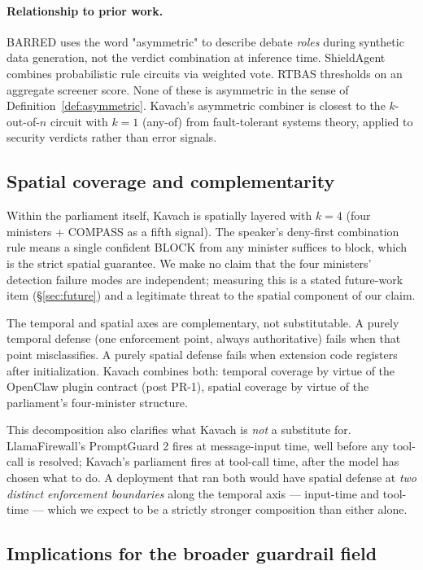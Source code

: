 \paragraph{Relationship to prior work.} BARRED \cite{barred2026} uses the word
"asymmetric" to describe debate \emph{roles} during synthetic data generation,
not the verdict combination at inference time. ShieldAgent
\cite{chen2025shieldagent} combines probabilistic rule circuits via weighted
vote. RTBAS \cite{zhong2025rtbas} thresholds on an aggregate screener score.
None of these is asymmetric in the sense of Definition~\ref{def:asymmetric}.
Kavach's asymmetric combiner is closest to the $k$-out-of-$n$ circuit with
$k=1$ (any-of) from fault-tolerant systems theory, applied to security verdicts
rather than error signals.

\subsection{Spatial coverage and complementarity}

Within the parliament itself, Kavach is spatially layered with \(k=4\)
(four ministers + COMPASS as a fifth signal). The speaker's deny-first
combination rule means a single confident BLOCK from any minister
suffices to block, which is the strict spatial guarantee. We make no
claim that the four ministers' detection failure modes are independent;
measuring this is a stated future-work item (\S\ref{sec:future}) and a
legitimate threat to the spatial component of our claim.

The temporal and spatial axes are complementary, not substitutable. A
purely temporal defense (one enforcement point, always authoritative)
fails when that point misclassifies. A purely spatial defense fails when
extension code registers after initialization. Kavach combines both:
temporal coverage by virtue of the OpenClaw plugin contract (post PR-1),
spatial coverage by virtue of the parliament's four-minister structure.

This decomposition also clarifies what Kavach is \emph{not} a substitute
for. LlamaFirewall's PromptGuard 2 fires at message-input time, well
before any tool-call is resolved; Kavach's parliament fires at tool-call
time, after the model has chosen what to do. A deployment that ran both
would have spatial defense at \emph{two distinct enforcement boundaries}
along the temporal axis — input-time and tool-time — which we expect to
be a strictly stronger composition than either alone.

\subsection{Implications for the broader guardrail field}

